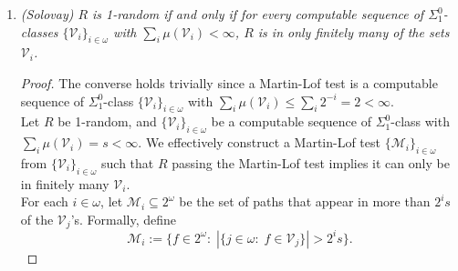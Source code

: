 \documentclass{article}
\begin{document}
\begin{enumerate}
\begin{proof}
      At stage $n+1$, we have $D_n=\{a_{n-1}+1,\ldots,a_n\}$ for some
      $a_{n-1}<a_n\in\omega$. We work within $\mathcal{A}_{a_n+1}$.
      Consider each string $\sigma\in2^{a_n}$ of length $a_n$. For each
      such string $\sigma$, the function $z_\sigma\in2^\omega$ that extends
      $\sigma$ with zeros (i.e. $z_\sigma\restriction|\sigma|=\sigma$ and
      $z_\sigma(x)=0$ if $x\geq|\sigma|$) is computable, hence must have an
      initial segment $\tau_\sigma$ contained in $A_{a_n+1}$. We enumerate
      the strings of $A_{a_n+1}$ until we get all initial segments
      $\tau_\sigma$ for each $\sigma$ in $2^{a_n}$. Now none of these
      strings $\tau_\sigma$ can be an initial segment of $f$ since
      $f\not\in\mathcal{A}_{a_n+1}$. Yet one of these strings
      $\tau_{f\restriction a_n}$ has an initial segment of length $a_n$ is
      the same as $f\restriction a_n$. But since $f$ does not extend
      $\tau_{f\restriction a_n}$, $f(x)$ must equal 1 at some
      $x\in\{a_n,\ldots,|\tau_{f\restriction a_n}|\}$. In particular, 
      $\{x:f(x)=1\}\cap\{a_n+1,\ldots,a_{n+1}\} \neq\emptyset$, where
      $a_{n+1}$ is defined as
      \[a_{n+1} =\max\{|\tau_\sigma|: \sigma\in2^{a_n}\}.\]
      So set $D_{n+1}=\{a_n+1,\ldots,a_{n+1}\}$. \\
    \end{proof}

  \item \it (Solovay) $R$ is 1-random if and only if for every computable
    sequence of $\Sigma^0_1$-classes $\{\mathcal{V}_i\}_{i\in\omega}$ with
    $\sum_i \mu(\mathcal{V}_i)<\infty$, $R$ is in only finitely many of the
    sets $\mathcal{V}_i$.

    \begin{proof}
      The converse holds trivially since a Martin-Lof test is a computable
      sequence of $\Sigma_1^0$-class $\{\mathcal{V}_i\}_{i\in\omega}$ with
      $\sum_i \mu(\mathcal{V}_i) \leq\sum_i 2^{-i} =2 <\infty$. \\

      Let $R$ be 1-random, and $\{\mathcal{V}_i\}_{i\in\omega}$ be a
      computable sequence of $\Sigma_1^0$-class with $\sum_i
      \mu(\mathcal{V}_i)=s<\infty$. We effectively construct a Martin-Lof
      test $\{\mathcal{M}_i\}_{i\in\omega}$ from
      $\{\mathcal{V}_i\}_{i\in\omega}$ such that $R$ passing the Martin-Lof
      test implies it can only be in finitely many $\mathcal{V}_i$. \\

      For each $i\in\omega$, let $\mathcal{M}_i\subseteq2^\omega$ be the
      set of paths that appear in more than $2^is$ of the $\mathcal{V}_j$'s.
      Formally, define
      \[\mathcal{M}_i :=\{f\in2^\omega:\; |\{j\in\omega:\;
      f\in\mathcal{V}_j\}| >2^is\}.\]


\end{proof}
\end{enumerate}
\end{document}
